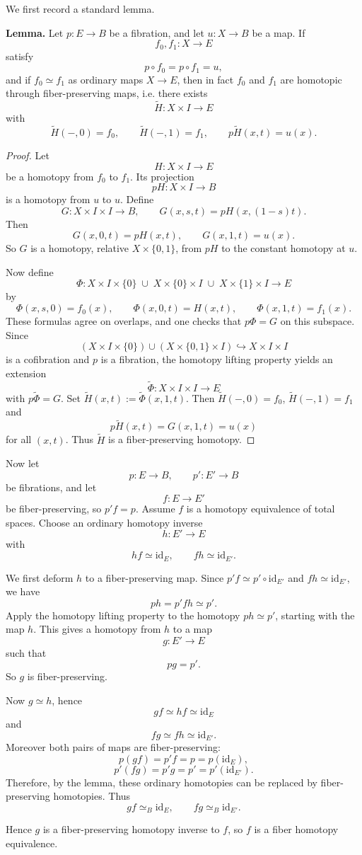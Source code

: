\documentclass[12pt]{article}
\begin{document}
\begin{solution}
We first record a standard lemma.

\medskip

\noindent\textbf{Lemma.}
Let \(p:E\to B\) be a fibration, and let \(u:X\to B\) be a map. If
\[
f_0,f_1:X\to E
\]
satisfy
\[
p\circ f_0=p\circ f_1=u,
\]
and if \(f_0\simeq f_1\) as ordinary maps \(X\to E\), then in fact \(f_0\) and \(f_1\) are homotopic through fiber-preserving maps, i.e. there exists
\[
\widetilde H:X\times I\to E
\]
with
\[
\widetilde H(-,0)=f_0,\qquad \widetilde H(-,1)=f_1,
\qquad p\widetilde H(x,t)=u(x).
\]

\begin{proof}
Let
\[
H:X\times I\to E
\]
be a homotopy from \(f_0\) to \(f_1\). Its projection
\[
pH:X\times I\to B
\]
is a homotopy from \(u\) to \(u\). Define
\[
G:X\times I\times I\to B,\qquad G(x,s,t)=pH(x,(1-s)t).
\]
Then
\[
G(x,0,t)=pH(x,t),\qquad G(x,1,t)=u(x).
\]
So \(G\) is a homotopy, relative \(X\times\{0,1\}\), from \(pH\) to the constant homotopy at \(u\).

Now define
\[
\Phi:X\times I\times\{0\}\;\cup\;X\times\{0\}\times I\;\cup\;X\times\{1\}\times I \to E
\]
by
\[
\Phi(x,s,0)=f_0(x),\qquad
\Phi(x,0,t)=H(x,t),\qquad
\Phi(x,1,t)=f_1(x).
\]
These formulas agree on overlaps, and one checks that $p\Phi=G$
on this subspace. Since
\[
(X\times I\times\{0\})\cup(X\times\{0,1\}\times I)\hookrightarrow X\times I\times I
\]
is a cofibration and \(p\) is a fibration, the homotopy lifting property yields an extension
\[
\widetilde\Phi:X\times I\times I\to E
\]
with
$p\widetilde\Phi=G$.
Set $\widetilde H(x,t):=\widetilde\Phi(x,1,t)$.
Then $\widetilde H(-,0)=f_0$, $\widetilde H(-,1)=f_1$
and \[p\widetilde H(x,t)=G(x,1,t)=u(x)\]
for all \((x,t)\). Thus \(\widetilde H\) is a fiber-preserving homotopy.
\end{proof}

\medskip

Now let
\[
p:E\to B,\qquad p':E'\to B
\]
be fibrations, and let
\[
f:E\to E'
\]
be fiber-preserving, so \(p'f=p\). Assume \(f\) is a homotopy equivalence of total spaces. Choose an ordinary homotopy inverse
\[
h:E'\to E
\]
with
\[
hf\simeq \mathrm{id}_E,\qquad fh\simeq \mathrm{id}_{E'}.
\]

We first deform \(h\) to a fiber-preserving map. Since \(p'f\simeq p' \circ \mathrm{id}_{E'}\) and \(fh\simeq \mathrm{id}_{E'}\), we have
\[
ph = p'fh \simeq p'.
\]
Apply the homotopy lifting property to the homotopy \(ph\simeq p'\), starting with the map \(h\). This gives a homotopy from \(h\) to a map
\[
g:E'\to E
\]
such that
\[
pg=p'.
\]
So \(g\) is fiber-preserving.

Now \(g\simeq h\), hence
\[
gf\simeq hf\simeq \mathrm{id}_E
\]
and
\[
fg\simeq fh\simeq \mathrm{id}_{E'}.
\]
Moreover both pairs of maps are fiber-preserving:
\[
p(gf)=p'f=p=p(\mathrm{id}_E),
\]
\[
p'(fg)=p'g=p'=p'(\mathrm{id}_{E'}).
\]
Therefore, by the lemma, these ordinary homotopies can be replaced by fiber-preserving homotopies. Thus
\[
gf\simeq_B \mathrm{id}_E,\qquad fg\simeq_B \mathrm{id}_{E'}.
\]

Hence \(g\) is a fiber-preserving homotopy inverse to \(f\), so \(f\) is a fiber homotopy equivalence.
\end{solution}
\end{document}
